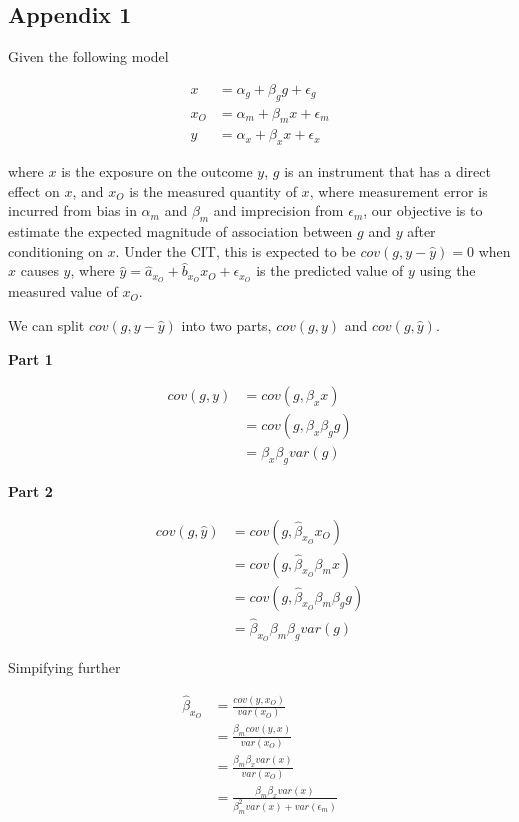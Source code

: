 \documentclass[]{article}
\begin{document}
\newpage

\subsection{Appendix 1}\label{appendix-1}

Given the following model

\[
\begin{aligned}
x & = \alpha_g + \beta_g g + \epsilon_g \\
x_O & = \alpha_m + \beta_m x + \epsilon_m \\
y & = \alpha_x + \beta_x x + \epsilon_x
\end{aligned}
\]

where \(x\) is the exposure on the outcome \(y\), \(g\) is an instrument
that has a direct effect on \(x\), and \(x_O\) is the measured quantity
of \(x\), where measurement error is incurred from bias in \(\alpha_m\)
and \(\beta_m\) and imprecision from \(\epsilon_m\), our objective is to
estimate the expected magnitude of association between \(g\) and \(y\)
after conditioning on \(x\). Under the CIT, this is expected to be
\(cov(g, y - \hat{y}) = 0\) when \(x\) causes \(y\), where
\(\hat{y} = \hat{a}_{x_O} + \hat{b}_{x_O} x_O + \epsilon_{x_O}\) is the
predicted value of \(y\) using the measured value of \(x_O\).

We can split \(cov(g, y - \hat{y})\) into two parts, \(cov(g, y)\) and
\(cov(g, \hat{y})\).

\textbf{Part 1}

\[
\begin{aligned}
cov(g, y) & = cov(g, \beta_x x) \\
          & = cov(g, \beta_x \beta_g g) \\
          & = \beta_x\beta_g var(g)
\end{aligned}
\]

\textbf{Part 2}

\[
\begin{aligned}
cov(g, \hat{y}) & = cov(g, \hat{\beta}_{x_O} x_O) \\
                & = cov(g, \hat{\beta}_{x_O} \beta_m x) \\
                & = cov(g, \hat{\beta}_{x_O} \beta_m \beta_g g) \\
                & = \hat{\beta}_{x_O} \beta_m \beta_g var(g)
\end{aligned}
\]

Simpifying further

\[
\begin{aligned}
\hat{\beta}_{x_O} & = \frac{cov(y, x_O)} {var(x_O)} \\
                  & = \frac{\beta_m cov(y, x)} {var(x_O)} \\
                  & = \frac{\beta_m \beta_x var(x)} {var(x_O)} \\
                  & = \frac{\beta_m \beta_x var(x)} {\beta_m^2 var(x) + var(\epsilon_m)}
\end{aligned}
\]
\end{document}
